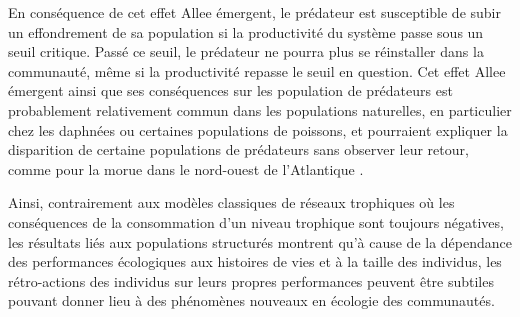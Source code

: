 En conséquence de cet effet Allee émergent, le prédateur est susceptible de
subir un effondrement de sa population si la productivité du système passe sous
un seuil critique. Passé ce seuil, le prédateur ne pourra plus se réinstaller
dans la communauté, même si la productivité repasse le seuil en question. 
Cet effet Allee émergent ainsi que ses conséquences sur les population de
prédateurs est probablement relativement commun dans les populations naturelles,
en particulier chez les daphnées \autocite{mccauley1987a} ou certaines
populations de poissons, et pourraient expliquer la disparition de certaine
populations de prédateurs sans observer leur retour, comme pour la morue dans le
nord-ouest de l'Atlantique \autocite{carscadden2001a}.

Ainsi, contrairement aux modèles classiques de réseaux  trophiques où les
conséquences de la consommation d'un niveau trophique sont toujours négatives,
les résultats liés aux populations structurés montrent qu'à cause de la
dépendance des performances écologiques aux histoires de vies et à la taille des
individus, les rétro-actions des individus sur leurs propres performances
peuvent être subtiles pouvant donner lieu à des phénomènes nouveaux en écologie
des communautés. 

